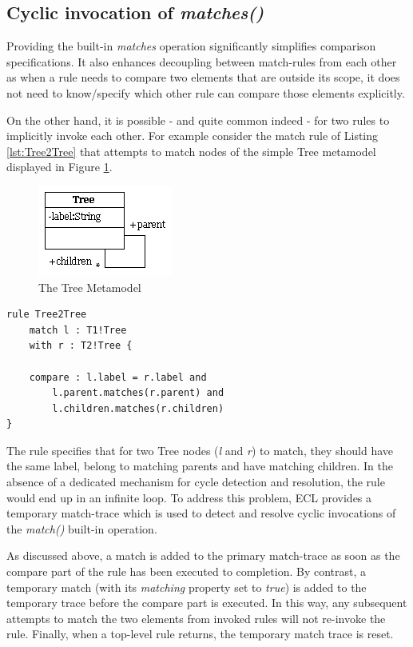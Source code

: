 \subsection{Cyclic invocation of \emph{matches()}}

Providing the built-in \emph{matches} operation significantly simplifies comparison specifications. It also enhances decoupling between match-rules from each other as when a rule needs to compare two elements that are outside its scope, it does not need to know/specify which other rule can compare those elements explicitly.

On the other hand, it is possible - and quite common indeed - for two rules to implicitly invoke each other. For example consider the match rule of Listing \ref{lst:Tree2Tree} that attempts to match nodes of the simple Tree metamodel displayed in Figure \ref{fig:Tree}.

\begin{figure}
	\centering
		\includegraphics{images/metamodels/Tree.png}
	\caption{The Tree Metamodel}
	\label{fig:Tree}
\end{figure}

\begin{lstlisting}[basicstyle=\ttfamily\footnotesize, flexiblecolumns=true, numbers=none, nolol=true, caption=The Tree2Tree rule, label=lst:Tree2Tree, language=ECL, numbers=left, tabsize=2]
rule Tree2Tree 
	match l : T1!Tree
	with r : T2!Tree {
	
	compare : l.label = r.label and 
		l.parent.matches(r.parent) and
		l.children.matches(r.children)
}
\end{lstlisting}

The rule specifies that for two Tree nodes (\emph{l} and \emph{r}) to match, they should have the same label, belong to matching parents and have matching children. In the absence of a dedicated mechanism for cycle detection and resolution, the rule would end up in an infinite loop. To address this problem, ECL provides a temporary match-trace which is used to detect and resolve cyclic invocations of the \emph{match()} built-in operation.

As discussed above, a match is added to the primary match-trace as soon as the compare part of the rule has been executed to completion. By contrast, a temporary match (with its \emph{matching} property set to \emph{true}) is added to the temporary trace before the compare part is executed. In this way, any subsequent attempts to match the two elements from invoked rules will not re-invoke the rule. Finally, when a top-level rule returns, the temporary match trace is reset.

